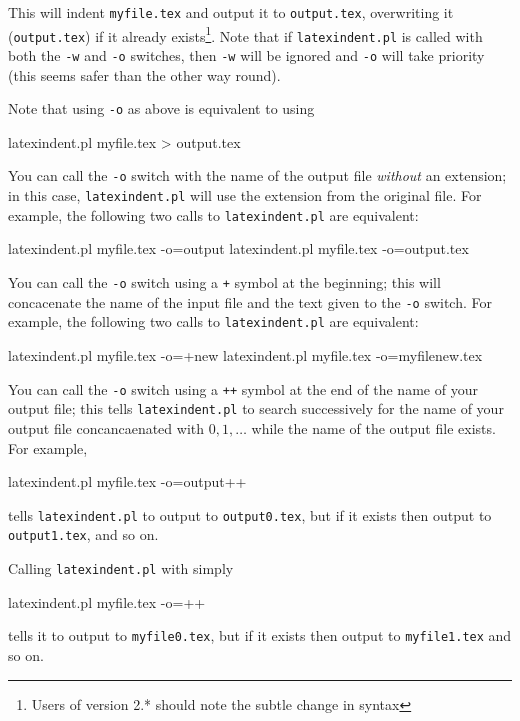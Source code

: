 	This will indent \texttt{myfile.tex} and output it to \texttt{output.tex},
	overwriting it (\texttt{output.tex}) if it already exists\footnote{Users of version 2.* should
		note the subtle change in syntax}. Note that if \texttt{latexindent.pl} is called with both
	the \texttt{-w} and \texttt{-o} switches, then \texttt{-w} will
	be ignored and \texttt{-o} will take priority (this seems safer than the
	other way round).

	Note that using \texttt{-o} as above is equivalent to using
	\begin{commandshell}
latexindent.pl myfile.tex > output.tex
\end{commandshell}

	You can call the \texttt{-o} switch with the name of the output file \emph{without} an extension; in
	this case, \texttt{latexindent.pl} will use the extension from the original file. For example,
	the following two calls to \texttt{latexindent.pl} are equivalent:
	\begin{commandshell}
latexindent.pl myfile.tex -o=output
latexindent.pl myfile.tex -o=output.tex
\end{commandshell}

	You can call the \texttt{-o} switch using a \texttt{+} symbol at the beginning; this will 
    concacenate the name of the input file and the text given to the \texttt{-o} switch.
	For example, the following two calls to \texttt{latexindent.pl} are equivalent:
	\begin{commandshell}
latexindent.pl myfile.tex -o=+new
latexindent.pl myfile.tex -o=myfilenew.tex
\end{commandshell}

	You can call the \texttt{-o} switch using a \texttt{++} symbol at the end of the name 
    of your output file; this tells \texttt{latexindent.pl} to search successively for 
    the name of your output file concancaenated with $0, 1, \ldots$ while the name of the 
    output file exists.  For example, 
	\begin{commandshell}
latexindent.pl myfile.tex -o=output++
\end{commandshell}
tells \texttt{latexindent.pl} to output to \texttt{output0.tex}, but if it exists then 
output to \texttt{output1.tex}, and so on.

Calling \texttt{latexindent.pl} with simply
	\begin{commandshell}
latexindent.pl myfile.tex -o=++
\end{commandshell}
tells it to output to \texttt{myfile0.tex}, but if it exists then output to \texttt{myfile1.tex}
and so on.

